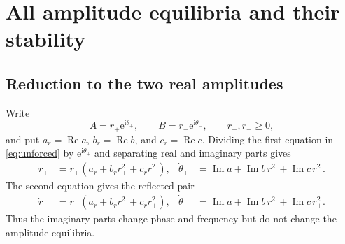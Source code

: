 \documentclass[11pt]{article}
\newcommand{\ii}{\mathrm{i}}
\newcommand{\ee}{\mathrm{e}}
\newcommand{\RePart}{\operatorname{Re}}
\newcommand{\ImPart}{\operatorname{Im}}
\begin{document}
\section{All amplitude equilibria and their stability}
\label{sec:equilibria}

\subsection{Reduction to the two real amplitudes}

Write
\begin{equation}
 A=r_+\ee^{\ii\theta_+},\qquad
 B=r_-\ee^{\ii\theta_-},\qquad r_+,r_-\geq0,
\end{equation}
and put $a_r=\RePart a$, $b_r=\RePart b$, and $c_r=\RePart c$.  Dividing the
first equation in \eqref{eq:unforced} by $\ee^{\ii\theta_+}$ and separating
real and imaginary parts gives
\begin{align}
 \dot r_+&=r_+(a_r+b_rr_+^2+c_rr_-^2),
 &\dot\theta_+&=\ImPart a+\ImPart b\,r_+^2+\ImPart c\,r_-^2.
 \label{eq:polarA}
\end{align}
The second equation gives the reflected pair
\begin{align}
 \dot r_-&=r_-(a_r+b_rr_-^2+c_rr_+^2),
 &\dot\theta_-&=\ImPart a+\ImPart b\,r_-^2+\ImPart c\,r_+^2.
 \label{eq:polarB}
\end{align}
Thus the imaginary parts change phase and frequency but do not change the
amplitude equilibria.
\end{document}
